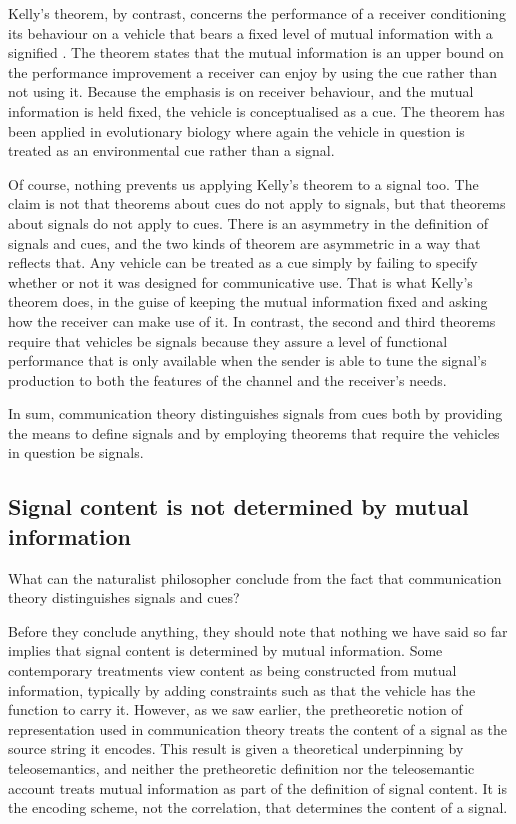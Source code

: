 Kelly's theorem, by contrast, concerns the performance of a receiver conditioning its behaviour on a vehicle that bears a fixed level of mutual information with a signified \citep{kelly1956new}.
The theorem states that the mutual information is an upper bound on the performance improvement a receiver can enjoy by using the cue rather than not using it.
Because the emphasis is on receiver behaviour, and the mutual information is held fixed, the vehicle is conceptualised as a cue.
The theorem has been applied in evolutionary biology \citep{donaldson-matasci2010fitness} where again the vehicle in question is treated as an environmental cue rather than a signal.

Of course, nothing prevents us applying Kelly's theorem to a signal too.
The claim is not that theorems about cues do not apply to signals, but that theorems about signals do not apply to cues.
There is an asymmetry in the definition of signals and cues, and the two kinds of theorem are asymmetric in a way that reflects that.
Any vehicle can be treated as a cue simply by failing to specify whether or not it was designed for communicative use.
That is what Kelly's theorem does, in the guise of keeping the mutual information fixed and asking how the receiver can make use of it.
In contrast, the second and third theorems require that vehicles be signals because they assure a level of functional performance that is only available when the sender is able to tune the signal's production to both the features of the channel and the receiver's needs.

In sum, communication theory distinguishes signals from cues both by providing the means to define signals and by employing theorems that require the vehicles in question be signals.

\subsection{Signal content is not determined by mutual information}

What can the naturalist philosopher conclude from the fact that communication theory distinguishes signals and cues?

Before they conclude anything, they should note that nothing we have said so far implies that signal content is determined by mutual information.
Some contemporary treatments view content as being constructed from mutual information, typically by adding constraints such as that the vehicle has the function to carry it.
However, as we saw earlier, the pretheoretic notion of representation used in communication theory treats the content of a signal as the source string it encodes.
This result is given a theoretical underpinning by teleosemantics, and neither the pretheoretic definition nor the teleosemantic account treats mutual information as part of the definition of signal content.
It is the encoding scheme, not the correlation, that determines the content of a signal.

